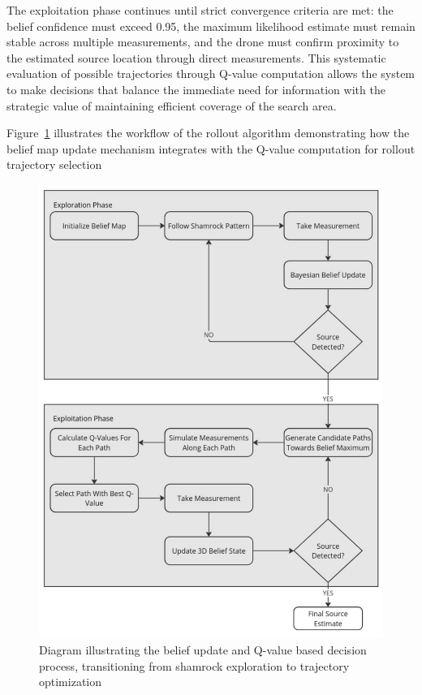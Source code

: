 \documentclass[../report.tex]{subfiles}
\begin{document}
    The exploitation phase continues until strict convergence criteria are met: the belief confidence must exceed 0.95, the maximum likelihood estimate must remain stable across multiple 
    measurements, and the drone must confirm proximity to the estimated source location through direct measurements. This systematic evaluation of possible trajectories through Q-value 
    computation allows the system to make decisions that balance the immediate need for information with the strategic value of maintaining efficient coverage of the search area.

    Figure~\ref{fig:rollout_algorithm_flow} illustrates the workflow of the rollout algorithm demonstrating how the belief map update mechanism integrates with 
    the Q-value computation for rollout trajectory selection
    \begin{figure}[ht]
        \centering
        \includegraphics[width=0.8\linewidth]{figures/rollout_flow.pdf}
        \caption{Diagram illustrating the belief update and Q-value based decision process, transitioning from shamrock exploration to trajectory optimization}
        \label{fig:rollout_algorithm_flow}
    \end{figure}
\end{document}
